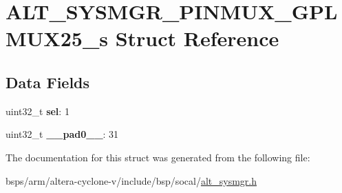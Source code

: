 \hypertarget{structALT__SYSMGR__PINMUX__GPLMUX25__s}{}\section{A\+L\+T\+\_\+\+S\+Y\+S\+M\+G\+R\+\_\+\+P\+I\+N\+M\+U\+X\+\_\+\+G\+P\+L\+M\+U\+X25\+\_\+s Struct Reference}
\label{structALT__SYSMGR__PINMUX__GPLMUX25__s}
\subsection*{Data Fields}
\begin{DoxyCompactItemize}
\item 
\mbox{\label{structALT__SYSMGR__PINMUX__GPLMUX25__s_a5d8f25a1ba5ddbbf5b03820b64aad1e4}} 
uint32\+\_\+t {\bfseries sel}\+: 1
\item 
\mbox{\label{structALT__SYSMGR__PINMUX__GPLMUX25__s_a123e0891cb1abc7ad40b158ac5dbd1cd}} 
uint32\+\_\+t {\bfseries \+\_\+\+\_\+pad0\+\_\+\+\_\+}\+: 31
\end{DoxyCompactItemize}


The documentation for this struct was generated from the following file\+:\begin{DoxyCompactItemize}
\item 
bsps/arm/altera-\/cyclone-\/v/include/bsp/socal/\mbox{\hyperlink{alt__sysmgr_8h}{alt\+\_\+sysmgr.\+h}}\end{DoxyCompactItemize}

